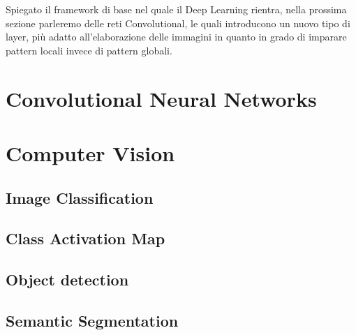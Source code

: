 Spiegato il framework di base nel quale il Deep Learning rientra, nella prossima sezione parleremo delle reti Convolutional, le quali introducono un nuovo tipo di layer, più adatto all'elaborazione delle immagini in quanto in grado di imparare pattern locali invece di pattern globali.

\section{Convolutional Neural Networks}

\section{Computer Vision}

\subsection{Image Classification}

\subsection{Class Activation Map}

\subsection{Object detection}

\subsection{Semantic Segmentation}